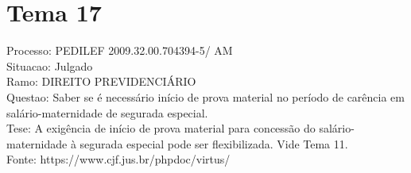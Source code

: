 \documentclass[12pt]{article}
\begin{document}
\section*{Tema 17}
Processo: PEDILEF 2009.32.00.704394-5/ AM\\
Situacao: Julgado\\
Ramo: DIREITO PREVIDENCIÁRIO\\
Questao: Saber se é necessário início de prova material no período de carência em salário-maternidade de segurada especial.\\
Tese: A exigência de início de prova material para concessão do salário-maternidade à segurada especial pode ser flexibilizada. Vide Tema 11.\\
Fonte: https://www.cjf.jus.br/phpdoc/virtus/
\end{document}
